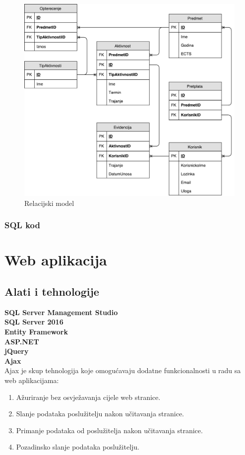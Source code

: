 \documentclass[times, utf8, zavrsni]{fer}
\begin{document}
\begin{figure}[H]
\centering
\includegraphics[scale=0.7]{img/relacijski-model.pdf}
\caption{Relacijski model}
\label{fig:relacijski-model}
\end{figure}

\subsection{SQL kod}
\lstset{style=sql}


\chapter{Web aplikacija}
\section{Alati i tehnologije}
\textbf{SQL Server Management Studio}\\
\textbf{SQL Server 2016}\\
\textbf{Entity Framework}\\
\textbf{ASP.NET}\\
\textbf{jQuery}\\
\textbf{Ajax}\\
Ajax je skup tehnologija koje omogućavaju dodatne funkcionalnosti u radu sa web aplikacijama:
\begin{enumerate}
\item Ažuriranje bez osvježavanja cijele web stranice.
\item Slanje podataka poslužitelju nakon učitavanja stranice.
\item Primanje podataka od poslužitelja nakon učitavanja stranice.
\item Pozadinsko slanje podataka poslužitelju.
\end{enumerate}
\end{document}

